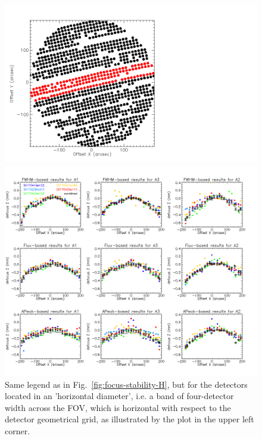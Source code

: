 \begin{figure}
  \includegraphics[trim={-2cm, 2cm, 0, 2cm}, clip, angle=0, scale=0.1]{Figures/fov_focus_stability_check_D2.png}
  \begin{center}
  \includegraphics[trim={0, 1cm, 0, 1cm},clip, angle=0, scale=0.45]{Figures/fov_focus_1D_Hband_5.png}
  \caption[Stability of the focus surface across the sequences]{Same
    legend as in Fig.~\ref{fig:focus-stability-H}, but for the
    detectors located in an 'horizontal diameter', i.e. a band of
    four-detector width across the FOV, which is horizontal with respect to
    the detector geometrical grid, as illustrated by the plot in the
    upper left corner. }
\label{fig:focus-stability-V}
\end{center}
\end{figure}


